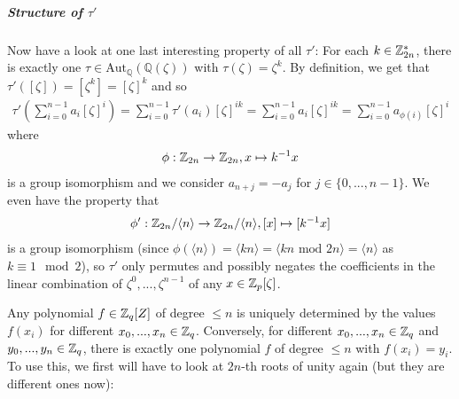 \subparagraph{Structure of $\tau'$}
Now have a look at one last interesting property of all $\tau'$: For each $k \in \mathbb{Z}_{2n}^*$, there is exactly one $\tau \in \text{Aut}_\mathbb{Q}(\mathbb{Q}(\zeta))$ with $\tau(\zeta) = \zeta^k$. By definition, we get that $\tau'([\zeta]) = [\zeta^k] = [\zeta]^k$ and so
\begin{equation}
\begin{split}
\tau'\left(\sum_{i = 0}^{n - 1} a_i [\zeta]^i\right) = \sum_{i = 0}^{n - 1} \tau'(a_i) [\zeta]^{ik} =  \sum_{i = 0}^{n - 1} a_i [\zeta]^{ik} = \sum_{i = 0}^{n - 1} a_{\phi(i)} [\zeta]^i
\end{split}\nonumber
\end{equation}
where 
\begin{equation}
\begin{split}
\phi: \mathbb{Z}_{2n} \to \mathbb{Z}_{2n}, x \mapsto k^{-1}x
\end{split}\nonumber
\end{equation}
is a group isomorphism and we consider $a_{n + j} = -a_j$ for $j \in \{0, ..., n-1 \}$. We even have the property that 
\begin{equation}
\begin{split}
\phi': \mathbb{Z}_{2n}/\langle n \rangle \to \mathbb{Z}_{2n}/\langle n \rangle, [x] \mapsto [k^{-1}x]
\end{split}\nonumber
\end{equation}
is a group isomorphism (since $\phi(\langle n \rangle) = \langle kn \rangle = \langle kn \text{ mod } 2n \rangle = \langle n \rangle$ as $k \equiv 1 \mod 2$), so $\tau'$ only permutes and possibly negates the coefficients in the linear combination of $\zeta^0, ..., \zeta^{n-1}$ of any $x \in \mathbb{Z}_p[\zeta]$.

\label{chinese_remainder_repr}
Any polynomial $f \in \mathbb{Z}_q[Z]$ of degree $\leq n$ is uniquely determined by the values $f(x_i)$ for different $x_0, ..., x_n \in \mathbb{Z}_q$. Conversely, for different $x_0, ..., x_n \in \mathbb{Z}_q$ and $y_0, ..., y_n \in \mathbb{Z}_q$, there is exactly one polynomial $f$ of degree $\leq n$ with $f(x_i) = y_i$. To use this, we first will have to look at $2n$-th roots of unity again (but they are different ones now):

